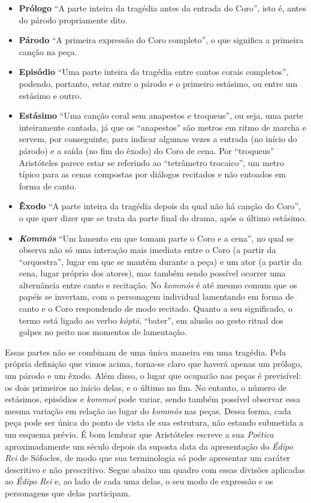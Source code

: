 \begin{itemize}
\item \textbf{Prólogo} ``A parte inteira da tragédia antes da entrada do
Coro'', isto é, antes do párodo propriamente dito.

\item \textbf{Párodo} ``A primeira expressão do Coro completo'', o que
significa a primeira canção na peça.

\item \textbf{Episódio} ``Uma parte inteira da tragédia entre cantos corais
completos'', podendo, portanto, estar entre o párodo e o primeiro
estásimo, ou entre um estásimo e outro.

\item \textbf{Estásimo} ``Uma canção coral sem anapestos e troqueus'', ou
seja, uma parte inteiramente cantada, já que os ``anapestos'' são metros
em ritmo de marcha e servem, por conseguinte, para indicar algumas vezes
a entrada (no início do párodo) e a saída (no fim do êxodo) do Coro de
cena. Por ``troqueus'' Aristóteles parece estar se referindo ao
``tetrâmetro trocaico'', um metro típico para as cenas compostas por
diálogos recitados e não entoados em forma de canto.

\item \textbf{Êxodo} ``A parte inteira da tragédia depois da qual não há
canção do Coro'', o que quer dizer que se trata da parte final do drama,
após o último estásimo.

\item \textbf{\emph{Kommós}} ``Um lamento em que tomam parte o Coro e a
cena'', no qual se observa não só uma interação mais imediata entre o
Coro (a partir da ``orquestra'', lugar em que se mantém durante a peça) e um
ator (a partir da cena, lugar próprio dos atores), mas também sendo
possível ocorrer uma alternância entre canto e recitação. No
\emph{kommós} é até mesmo comum que os papéis se invertam, com o
personagem individual lamentando em forma de canto e o Coro respondendo
de modo recitado. Quanto a seu significado, o termo está ligado ao verbo
\emph{kóptō}, ``bater'', em alusão ao gesto ritual dos golpes no peito
nos momentos de lamentação.
\end{itemize}

Essas partes não se combinam de uma única maneira em uma tragédia. Pela
própria definição que vimos acima, torna-se claro que haverá apenas um
prólogo, um párodo e um êxodo. Além disso, o lugar que ocuparão nas
peças é previsível: os dois primeiros no início delas, e o último no
fim. No entanto, o número de estásimos, episódios e \emph{kommoí} pode
variar, sendo também possível observar essa mesma variação em relação ao
lugar do \emph{kommós} nas peças. Dessa forma, cada peça pode ser única
do ponto de vista de sua estrutura, não estando submetida a um esquema
prévio. É bom lembrar que Aristóteles escreve a sua \emph{Poética}
aproximadamente um século depois da suposta data da apresentação do
\emph{Édipo Rei} de Sófocles, de modo que sua terminologia só pode
apresentar um caráter descritivo e não prescritivo. Segue abaixo um
quadro com essas divisões aplicadas ao \emph{Édipo Rei} e, ao lado de
cada uma delas, o seu modo de expressão e os personagens que delas
participam.


